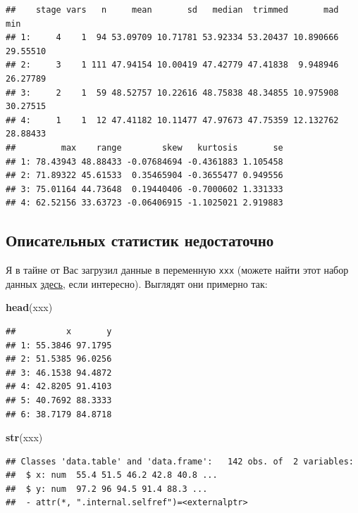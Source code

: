 \documentclass[]{book}
\newenvironment{Shaded}{\begin{snugshade}}{\end{snugshade}}
\newcommand{\KeywordTok}[1]{\textcolor[rgb]{0.13,0.29,0.53}{\textbf{#1}}}
\newcommand{\NormalTok}[1]{#1}
\begin{document}
\begin{verbatim}
##    stage vars   n     mean       sd   median  trimmed       mad      min
## 1:     4    1  94 53.09709 10.71781 53.92334 53.20437 10.890666 29.55510
## 2:     3    1 111 47.94154 10.00419 47.42779 47.41838  9.948946 26.27789
## 3:     2    1  59 48.52757 10.22616 48.75838 48.34855 10.975908 30.27515
## 4:     1    1  12 47.41182 10.11477 47.97673 47.75359 12.132762 28.88433
##         max    range        skew   kurtosis       se
## 1: 78.43943 48.88433 -0.07684694 -0.4361883 1.105458
## 2: 71.89322 45.61533  0.35465904 -0.3655477 0.949556
## 3: 75.01164 44.73648  0.19440406 -0.7000602 1.331333
## 4: 62.52156 33.63723 -0.06406915 -1.1025021 2.919883
\end{verbatim}

\subsection{Описательных статистик недостаточно}\label{datasaurus}

Я в тайне от Вас загрузил данные в переменную \texttt{xxx} (можете найти
этот набор данных
\href{https://raw.githubusercontent.com/Pozdniakov/stats/master/data/d.csv}{здесь},
если интересно). Выглядят они примерно так:

\begin{Shaded}
\begin{Highlighting}[]
\KeywordTok{head}\NormalTok{(xxx)}
\end{Highlighting}
\end{Shaded}

\begin{verbatim}
##          x       y
## 1: 55.3846 97.1795
## 2: 51.5385 96.0256
## 3: 46.1538 94.4872
## 4: 42.8205 91.4103
## 5: 40.7692 88.3333
## 6: 38.7179 84.8718
\end{verbatim}

\begin{Shaded}
\begin{Highlighting}[]
\KeywordTok{str}\NormalTok{(xxx)}
\end{Highlighting}
\end{Shaded}

\begin{verbatim}
## Classes 'data.table' and 'data.frame':   142 obs. of  2 variables:
##  $ x: num  55.4 51.5 46.2 42.8 40.8 ...
##  $ y: num  97.2 96 94.5 91.4 88.3 ...
##  - attr(*, ".internal.selfref")=<externalptr>
\end{verbatim}
\end{document}

